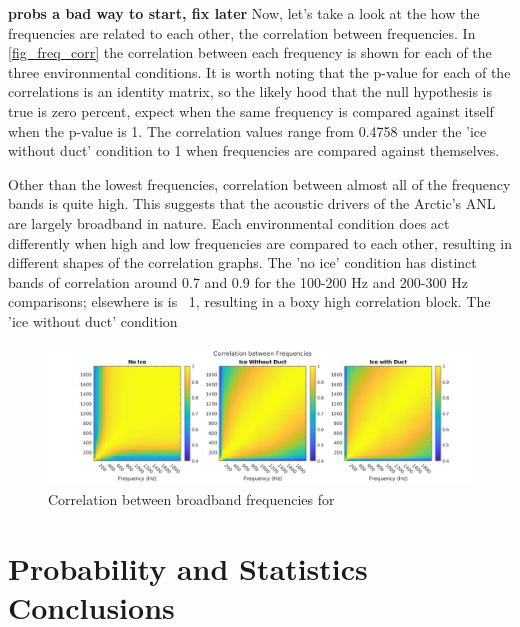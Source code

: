 \textbf{probs a bad way to start, fix later }Now, let's take a look at the how the frequencies are related to each other, the correlation between frequencies. In \autoref{fig_freq_corr} the correlation between each frequency is shown for each of the three environmental conditions. It is worth noting that the p-value for each of the correlations is an identity matrix, so the likely hood that the null hypothesis is true is zero percent, expect when the same frequency is compared against itself when the p-value is 1. The correlation values range from 0.4758 under the 'ice without duct' condition to 1 when frequencies are compared against themselves. 

Other than the lowest frequencies, correlation between almost all of the frequency bands is quite high. This suggests that the acoustic drivers of the Arctic's ANL are largely broadband in nature. Each environmental condition does act differently when high and low frequencies are compared to each other, resulting in different shapes of the correlation graphs. The 'no ice' condition has distinct bands of correlation around 0.7 and 0.9 for the 100-200 Hz and 200-300 Hz comparisons; elsewhere is is ~1, resulting in a boxy high correlation block. The 'ice without duct' condition  

\begin{figure}[h]
\centering
\includegraphics[scale=0.38]{Figures/corr_all_1x3.jpg}
\caption{Correlation between broadband frequencies for }
\label{fig_freq_corr}
\end{figure}




\section{Probability and Statistics Conclusions}

